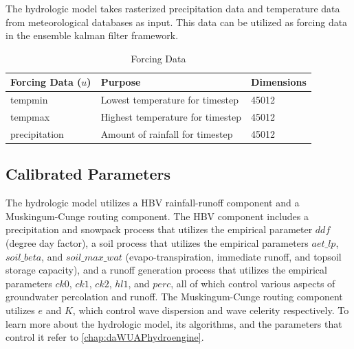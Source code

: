 The hydrologic model takes rasterized precipitation data and temperature data from meteorological databases as input. This data can be utilized as forcing data in the ensemble kalman filter framework.
\begin{table}[]
\caption{Forcing Data} 
\begin{tabular}{lll}
Forcing Data ($u$) & Purpose                          & Dimensions \\ \hline
tempmin          & Lowest temperature for timestep  & 45012 \\
tempmax          & Highest temperature for timestep & 45012 \\
precipitation      & Amount of rainfall for timestep & 45012 
\end{tabular}
\label{tab:u_params}
\end{table}

\subsection{Calibrated Parameters}

The hydrologic model utilizes a HBV rainfall-runoff component and a Muskingum-Cunge routing component. The HBV component includes a precipitation and snowpack process that utilizes the empirical parameter $ddf$ (degree day factor), a soil process that utilizes the empirical parameters $aet\_lp$, $soil\_beta$, and $soil\_max\_wat$ (evapo-transpiration, immediate runoff, and topsoil storage capacity), and a runoff generation process that utilizes the empirical parameters $ck0$, $ck1$, $ck2$, $hl1$, and $perc$, all of which control various aspects of groundwater percolation and runoff. The Muskingum-Cunge routing component utilizes $e$ and $K$, which control wave dispersion and wave celerity respectively. To learn more about the hydrologic model, its algorithms, and the parameters that control it refer to \autoref{chap:daWUAPhydroengine}.

